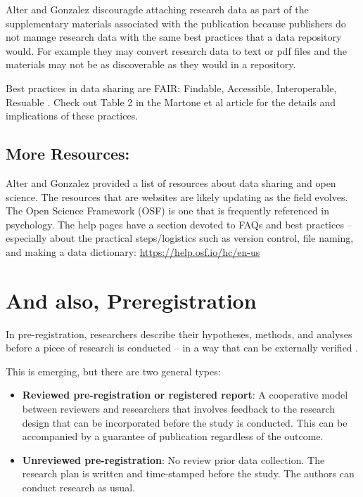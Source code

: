 \documentclass[
  english,
]{book}
\providecommand{\tightlist}{%
  \setlength{\itemsep}{0pt}\setlength{\parskip}{0pt}}
\begin{document}
Alter and Gonzalez \citeyearpar{alter_responsible_2018} discouragde attaching research data as part of the supplementary materials associated with the publication because publishers do not manage research data with the same best practices that a data repository would. For example they may convert research data to text or pdf files and the materials may not be as discoverable as they would in a repository.

Best practices in data sharing are FAIR: Findable, Accessible, Interoperable, Resuable \citep{martone_data_2018}. Check out Table 2 in the Martone et al article for the details and implications of these practices.

\hypertarget{more-resources}{%
\subsection{More Resources:}\label{more-resources}}

Alter and Gonzalez \citeyearpar{alter_responsible_2018} provided a list of resources about data sharing and open science. The resources that are websites are likely updating as the field evolves. The Open Science Framework (OSF) is one that is frequently referenced in psychology. The help pages have a section devoted to FAQs and best practices -- especially about the practical steps/logistics such as version control, file naming, and making a data dictionary: \url{https://help.osf.io/hc/en-us}

\hypertarget{and-also-preregistration}{%
\section{And also, Preregistration}\label{and-also-preregistration}}

In pre-registration, researchers describe their hypotheses, methods, and analyses before a piece of research is conducted -- in a way that can be externally verified \citep{van_t_veer_pre-registration_2016}.

This is emerging, but there are two general types:

\begin{itemize}
\tightlist
\item
  \textbf{Reviewed pre-registration or registered report}: A cooperative model between reviewers and researchers that involves feedback to the research design that can be incorporated before the study is conducted. This can be accompanied by a guarantee of publication regardless of the outcome.
\item
  \textbf{Unreviewed pre-registration}: No review prior data collection. The research plan is written and time-stamped before the study. The authors can conduct research as usual.
\end{itemize}
\end{document}
